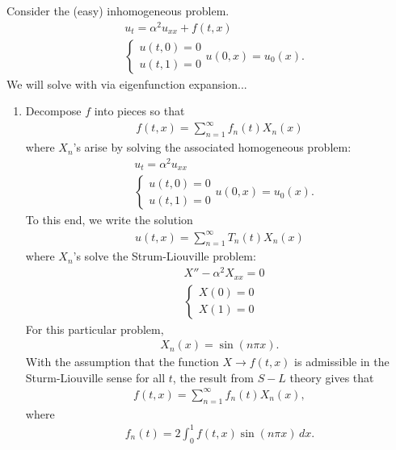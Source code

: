 \documentclass{book}
\theoremstyle{definition}
\begin{document}
Consider the (easy) inhomogeneous problem. 
\begin{align*}
&u_t = \alpha^2 u_{xx} + f(t,x)\\
&\begin{cases}
u(t,0) = 0\\
u(t,1) = 0
\end{cases}
u(0,x) = u_0(x).
\end{align*}
We will solve with via eigenfunction expansion...
\begin{enumerate}
	\item Decompose $f$ into pieces so that
	\begin{align*}
	f(t,x) = \sum^\infty_{n=1}f_n(t)X_n(x)
	\end{align*}
	where $X_n$'s arise by solving the associated homogeneous problem:
	\begin{align*}
	&u_t = \alpha^2 u_{xx}\\
	&\begin{cases}
	u(t,0) = 0\\
	u(t,1) = 0
	\end{cases}
	u(0,x) = u_0(x).
	\end{align*}
	To this end, we write the solution
	\begin{align*}
	u(t,x) = \sum^\infty_{n=1}T_n(t)X_n(x)
	\end{align*}
	where $X_n$'s solve the Strum-Liouville problem:
	\begin{align*}
	&X'' - \alpha^2 X_{xx} = 0\\
	&\begin{cases}
	X(0) = 0\\
	X(1) = 0
	\end{cases}
	\end{align*}
	For this particular problem, 
	\begin{align*}
	X_n(x) = \sin(n\pi x).
	\end{align*}
	With the assumption that the function $X \to f(t,x)$ is admissible in the Sturm-Liouville sense for all $t$, the result from $S-L$ theory gives that 
	\begin{align*}
	f(t,x) = \sum_{n=1}^\infty f_n(t)X_n(x),
	\end{align*}
	where
	\begin{align*}
	f_n(t) = 2\int^1_0 f(t,x)\sin(n\pi x)\,dx.
	\end{align*}
	
	
	

\end{enumerate}
\end{document}
